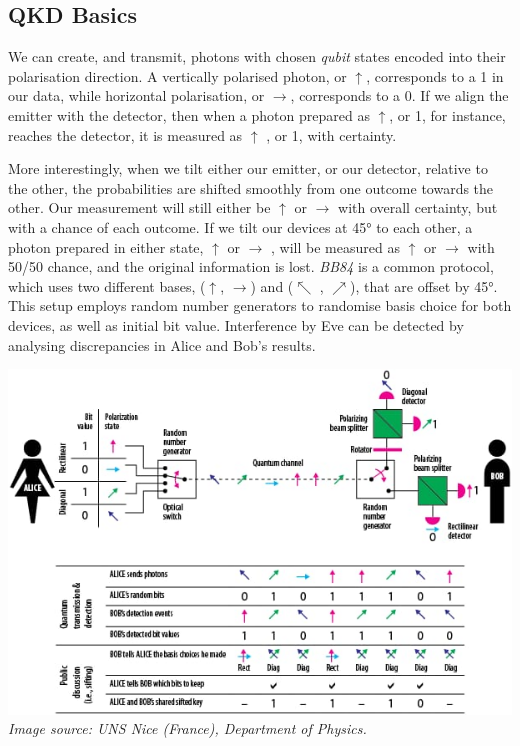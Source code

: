 \documentclass[journal]{vgtc}
\begin{document}
\begin{tcolorbox}
\section*{QKD Basics}

We can create, and transmit, photons with chosen \textit{qubit} states encoded into their polarisation direction. A vertically polarised photon, or $\uparrow$, corresponds to a 1 in our data, while horizontal polarisation, or $\rightarrow$, corresponds to a 0. If we align the emitter with the detector, then when a photon prepared as $\uparrow$, or 1, for instance, reaches the detector, it is measured as $\uparrow$ , or 1, with certainty.

More interestingly, when we tilt either our emitter, or our detector, relative to the other, the probabilities are shifted smoothly from one outcome towards the other. Our measurement will still either be $\uparrow$ or $\rightarrow$ with overall certainty, but with a chance of each outcome. If we tilt our devices at \ang{45} to each other, a photon prepared in either state, $\uparrow$ or $\rightarrow$ , will be measured as $\uparrow$ or $\rightarrow$ with 50/50 chance, and the original information is lost. \textit{BB84} is a common protocol, which uses two different bases, ($\uparrow$, $\rightarrow$) and ($\nwarrow$ , $\nearrow$), that are offset by \ang{45}. This setup employs random number generators to randomise basis choice for both devices, as well as initial bit value. Interference by Eve can be detected by analysing discrepancies in Alice and Bob's results. 

\includegraphics[width=\linewidth]{Box_2}
\textit{Image source: UNS Nice (France), Department of Physics.}

\end{tcolorbox}
\end{document}
